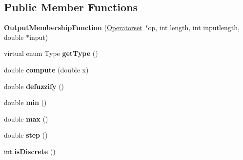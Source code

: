 \subsection*{Public Member Functions}
\begin{DoxyCompactItemize}
\item 
\hypertarget{classOutputMembershipFunction_a1056b9b5bf2be39be796a4997b5f2b76}{
{\bfseries OutputMembershipFunction} (\hyperlink{classOperatorset}{Operatorset} $\ast$op, int length, int inputlength, double $\ast$input)}
\label{classOutputMembershipFunction_a1056b9b5bf2be39be796a4997b5f2b76}

\item 
\hypertarget{classOutputMembershipFunction_a5516ae582ab895ab389a2952281e7661}{
virtual enum Type {\bfseries getType} ()}
\label{classOutputMembershipFunction_a5516ae582ab895ab389a2952281e7661}

\item 
\hypertarget{classOutputMembershipFunction_a5ce7ef78187b30b921416b9d5251d790}{
double {\bfseries compute} (double x)}
\label{classOutputMembershipFunction_a5ce7ef78187b30b921416b9d5251d790}

\item 
\hypertarget{classOutputMembershipFunction_a951043befc1e0bb8c32ea09e39e8972a}{
double {\bfseries defuzzify} ()}
\label{classOutputMembershipFunction_a951043befc1e0bb8c32ea09e39e8972a}

\item 
\hypertarget{classOutputMembershipFunction_a7b0f6264177855d276f483fc05f67688}{
double {\bfseries min} ()}
\label{classOutputMembershipFunction_a7b0f6264177855d276f483fc05f67688}

\item 
\hypertarget{classOutputMembershipFunction_a76ed5862cea231d3ef6ae53cc355b670}{
double {\bfseries max} ()}
\label{classOutputMembershipFunction_a76ed5862cea231d3ef6ae53cc355b670}

\item 
\hypertarget{classOutputMembershipFunction_adc18a24471324476ce0f5755f84659eb}{
double {\bfseries step} ()}
\label{classOutputMembershipFunction_adc18a24471324476ce0f5755f84659eb}

\item 
\hypertarget{classOutputMembershipFunction_a424763bde0a4546685fcddd954486e14}{
int {\bfseries isDiscrete} ()}
\label{classOutputMembershipFunction_a424763bde0a4546685fcddd954486e14}

\end{DoxyCompactItemize}
